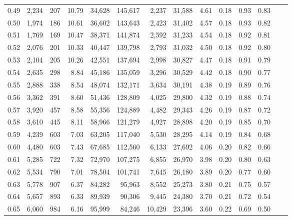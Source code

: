 \begin{tabular}{rrrrrrrrrrrrrr}
0.49 &  2,234 &    207 &   10.79 &   34,628 &  145,617 &   2,237 &  31,588 &  4.61 &  0.18 &  0.93 &      0.83 \\
0.50 &  1,974 &    186 &   10.61 &   36,602 &  143,643 &   2,423 &  31,402 &  4.57 &  0.18 &  0.93 &      0.82 \\
0.51 &  1,769 &    169 &   10.47 &   38,371 &  141,874 &   2,592 &  31,233 &  4.54 &  0.18 &  0.92 &      0.81 \\
0.52 &  2,076 &    201 &   10.33 &   40,447 &  139,798 &   2,793 &  31,032 &  4.50 &  0.18 &  0.92 &      0.80 \\
0.53 &  2,104 &    205 &   10.26 &   42,551 &  137,694 &   2,998 &  30,827 &  4.47 &  0.18 &  0.91 &      0.79 \\
0.54 &  2,635 &    298 &    8.84 &   45,186 &  135,059 &   3,296 &  30,529 &  4.42 &  0.18 &  0.90 &      0.77 \\
0.55 &  2,888 &    338 &    8.54 &   48,074 &  132,171 &   3,634 &  30,191 &  4.38 &  0.19 &  0.89 &      0.76 \\
0.56 &  3,362 &    391 &    8.60 &   51,436 &  128,809 &   4,025 &  29,800 &  4.32 &  0.19 &  0.88 &      0.74 \\
0.57 &  3,920 &    457 &    8.58 &   55,356 &  124,889 &   4,482 &  29,343 &  4.26 &  0.19 &  0.87 &      0.72 \\
0.58 &  3,610 &    445 &    8.11 &   58,966 &  121,279 &   4,927 &  28,898 &  4.20 &  0.19 &  0.85 &      0.70 \\
0.59 &  4,239 &    603 &    7.03 &   63,205 &  117,040 &   5,530 &  28,295 &  4.14 &  0.19 &  0.84 &      0.68 \\
0.60 &  4,480 &    603 &    7.43 &   67,685 &  112,560 &   6,133 &  27,692 &  4.06 &  0.20 &  0.82 &      0.66 \\
0.61 &  5,285 &    722 &    7.32 &   72,970 &  107,275 &   6,855 &  26,970 &  3.98 &  0.20 &  0.80 &      0.63 \\
0.62 &  5,534 &    790 &    7.01 &   78,504 &  101,741 &   7,645 &  26,180 &  3.89 &  0.20 &  0.77 &      0.60 \\
0.63 &  5,778 &    907 &    6.37 &   84,282 &   95,963 &   8,552 &  25,273 &  3.80 &  0.21 &  0.75 &      0.57 \\
0.64 &  5,657 &    893 &    6.33 &   89,939 &   90,306 &   9,445 &  24,380 &  3.70 &  0.21 &  0.72 &      0.54 \\
0.65 &  6,060 &    984 &    6.16 &   95,999 &   84,246 &  10,429 &  23,396 &  3.60 &  0.22 &  0.69 &      0.50 \\

\end{tabular}
